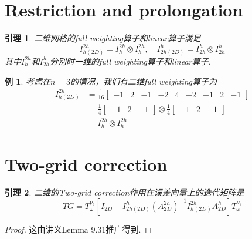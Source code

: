 \documentclass[a4paper,11.5pt,UTF8]{ctexart}
\newtheorem{example}{例}[section]
\newtheorem{lemma}{引理}[section]
\begin{document}
\begin{large}
\section{Restriction and prolongation}
\begin{lemma}
	二维网格的full weighting算子和linear算子满足
	$$I_{h(2D)}^{2h} = I^{2h}_{h}\otimes I^{2h}_{h},\quad I_{2h(2D)}^{h}=I^{h}_{2h}\otimes I^{h}_{2h}$$
	其中$I_{h}^{2h}$和$I_{2h}^{h}$分别时一维的full weighting算子和linear算子.
\end{lemma}
\begin{example}
	考虑在$n=3$的情况，我们有二维full weighting算子为
	\begin{align*}
		I^{2h}_{h(2D)} &= \frac{1}{16}\begin{bmatrix}
			-1 & 2 & -1 & -2 & 4 & -2 & -1 & 2 & -1 
		\end{bmatrix} \\
		&= \frac{1}{4}\begin{bmatrix} -1 & 2 & -1 \end{bmatrix} \otimes
		   \frac{1}{4}\begin{bmatrix} -1 & 2 & -1 \end{bmatrix} \\
		&= I^{2h}_{h}\otimes I^{2h}_{h}
	\end{align*}
\end{example}

\section{Two-grid correction}
\begin{lemma}
	二维的Two-grid correction作用在误差向量上的迭代矩阵是
	$$TG=T_{\omega}^{\nu_2}[I_{2D}-I^{h}_{2h(2D)}(A^{2h}_{2D})^{-1}I^{2h}_{h(2D)}A^h_{2D}]T_{\omega}^{\nu_1}$$
\end{lemma}
\begin{proof}
	这由讲义Lemma 9.31推广得到.
\end{proof}


\end{large}
\end{document}
